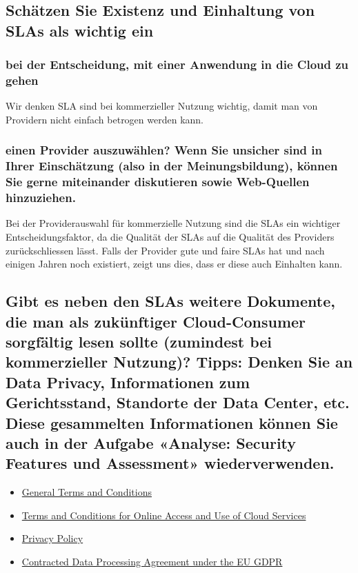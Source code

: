\documentclass[11pt,titlepage]{article}
\begin{document}
\subsection{Schätzen Sie Existenz und Einhaltung von SLAs als wichtig ein}
\subsubsection{bei der Entscheidung, mit einer Anwendung in die Cloud zu gehen}
Wir denken SLA sind bei kommerzieller Nutzung wichtig, damit man von Providern nicht einfach betrogen werden kann.
\subsubsection{einen Provider auszuwählen? Wenn Sie unsicher sind in Ihrer Einschätzung (also in der Meinungsbildung), können Sie gerne miteinander diskutieren sowie Web-Quellen hinzuziehen.}
Bei der Providerauswahl für kommerzielle Nutzung sind die SLAs ein wichtiger Entscheidungsfaktor, da die Qualität der SLAs auf die Qualität des Providers zurückschliessen lässt. Falls der Provider gute und faire SLAs hat und nach einigen Jahren noch existiert, zeigt uns dies, dass er diese auch Einhalten kann.
\subsection{Gibt es neben den SLAs weitere Dokumente, die man als zukünftiger Cloud-Consumer sorgfältig lesen sollte (zumindest bei kommerzieller Nutzung)? Tipps: Denken Sie an Data Privacy, Informationen zum Gerichtsstand, Standorte der Data Center, etc. Diese gesammelten Informationen können Sie auch in der Aufgabe «Analyse: Security Features und Assessment» wiederverwenden.}
\begin{itemize}
	\item \href{http://documents.swisscom.com/topic/0000012-Legal/Documents/AGB/leg0002_new-en.pdf}{General Terms and Conditions}
	\item \href{https://developer.swisscom.com/static/media/TermsAndConditionsForOnlineAccessAndUse-en.2c434fc7.pdf}{Terms and Conditions for Online Access and Use of Cloud Services}
	\item \href{https://www.swisscom.ch/en/residential/legal-information/online-privacy.html}{Privacy Policy}
	\item \href{http://documents.swisscom.com/product/filestore/lib/1b918123-2b87-4ef0-b270-d7ff329e8163/APC_DPA_EUGDPR.pdf}{Contracted Data Processing Agreement under the EU GDPR}
	
\end{itemize}
\end{document}
